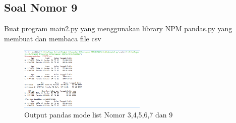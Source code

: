 \subsection{Soal Nomor 9}
Buat program main2.py yang menggunakan library NPM pandas.py yang membuat dan membaca file csv


\begin{figure}[!htbp]
  \centering
  \includegraphics[height=3cm]{figures/4/1174076/Praktek/main2.png}
  \caption{Output pandas mode list Nomor 3,4,5,6,7 dan 9}
\end{figure}



